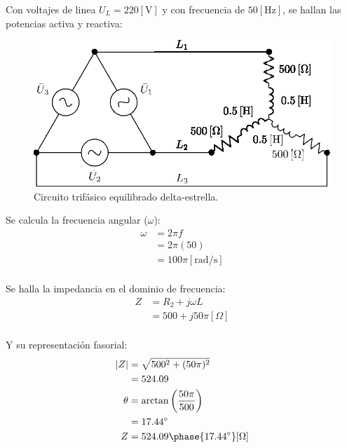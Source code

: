 \documentclass[letter,11pt]{article}
\begin{document}
Con voltajes de linea $U_L=220[\text{V}]$ y con frecuencia de $50[\text{Hz}]$,
se hallan las potencias activa y reactiva:

\begin{figure}[!h]
\centering
\includegraphics[scale=0.95]{figura1.eps}
\caption{Circuito trifásico equilibrado delta-estrella.}
\label{circuito1}
\end{figure}

Se calcula la frecuencia angular ($\omega$):
\begin{equation*}
    \begin{split}
        \omega &= 2\pi f\\
               &= 2\pi(50)\\
               &= 100\pi[\text{rad}/\text{s}]\\
    \end{split}
\end{equation*}

Se halla la impedancia en el dominio de frecuencia:
\begin{equation*}
    \begin{split}
        Z &= R_2+j\omega L\\
          &= 500+j50\pi[\Omega]\\
    \end{split}
\end{equation*}

Y su representación fasorial:
\begin{equation*}
    \begin{split}
        |Z| &= \sqrt{500^2+(50\pi)^2}\\
            &= 524.09\\
        \theta &= \arctan\left(\frac{50\pi}{500}\right)\\
               &= 17.44^{\circ}\\
        Z &= 524.09\phase{17.44^{\circ}}[\Omega]\\
    \end{split}
\end{equation*}
\end{document}
